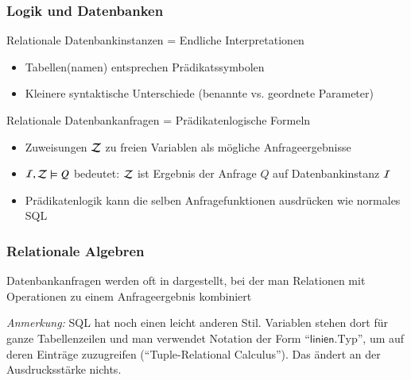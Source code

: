 \documentclass[onlymath]{beamer}
\begin{document}
\maketitle

% 
% 

\begin{frame}\frametitle{Logik und Datenbanken}

\alert{Relationale Datenbankinstanzen = Endliche Interpretationen}
\begin{itemize}
\item Tabellen(namen) entsprechen Prädikatssymbolen
\item Kleinere syntaktische Unterschiede (benannte vs. geordnete Parameter)
\end{itemize}

\alert{Relationale Datenbankanfragen = Prädikatenlogische Formeln}
\begin{itemize}
\item Zuweisungen $\mathcal{Z}$ zu freien Variablen als mögliche Anfrageergebnisse
\item $\mathcal{I},\mathcal{Z}\models Q$ bedeutet: $\mathcal{Z}$ ist Ergebnis der Anfrage $Q$ auf Datenbankinstanz $\mathcal{I}$
\item Prädikatenlogik kann die selben Anfragefunktionen ausdrücken wie normales SQL
\end{itemize}


\end{frame}

\begin{frame}\frametitle{Relationale Algebren}

Datenbankanfragen werden oft in  dargestellt,
bei der man Relationen mit Operationen zu einem Anfrageergebnis kombiniert
\bigskip


\footnotesize
\emph{Anmerkung:} SQL hat noch einen leicht anderen Stil. Variablen stehen dort für ganze Tabellenzeilen und man verwendet Notation der Form "`$\textsf{linien}.\text{Typ}$"', um auf deren Einträge zuzugreifen ("`Tuple-Relational Calculus"'). Das ändert an der Ausdrucksstärke nichts.

\end{frame}
\end{document}

